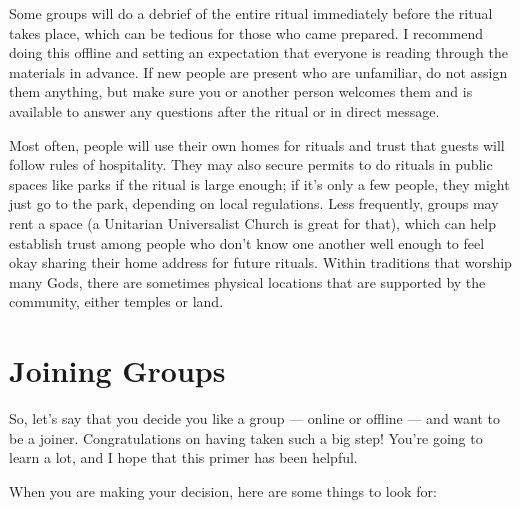 \documentclass[
]{book}
\begin{document}
Some groups will do a debrief of the entire ritual immediately before the ritual takes place, which can be tedious for those who came prepared. I recommend doing this offline and setting an expectation that everyone is reading through the materials in advance. If new people are present who are unfamiliar, do not assign them anything, but make sure you or another person welcomes them and is available to answer any questions after the ritual or in direct message.

Most often, people will use their own homes for rituals and trust that guests will follow rules of hospitality. They may also secure permits to do rituals in public spaces like parks if the ritual is large enough; if it's only a few people, they might just go to the park, depending on local regulations. Less frequently, groups may rent a space (a Unitarian Universalist Church is great for that), which can help establish trust among people who don't know one another well enough to feel okay sharing their home address for future rituals. Within traditions that worship many Gods, there are sometimes physical locations that are supported by the community, either temples or land.

\hypertarget{joining-groups}{%
\section{Joining Groups}\label{joining-groups}}

So, let's say that you decide you like a group --- online or offline --- and want to be a joiner. Congratulations on having taken such a big step! You're going to learn a lot, and I hope that this primer has been helpful.

When you are making your decision, here are some things to look for:
\end{document}
